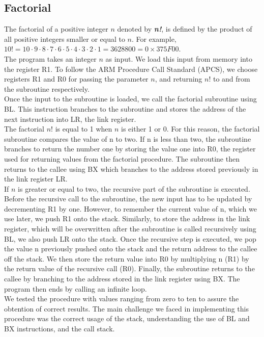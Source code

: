 \documentclass[10pt]{article}
\begin{document}
\subsection{Factorial}
The factorial of a positive integer $n$ denoted by \textbf{\textit{n!}}, is defined by the product of all positive integers smaller or equal to $n$. For example, $10! = 10 \cdot 9 \cdot 8 \cdot 7 \cdot 6 \cdot 5 \cdot 4 \cdot 3 \cdot 2 \cdot 1 = 3628800 = 0\times375F00$.\\
The program takes an integer $n$ as input. We load this input from memory into the register R1. To follow the ARM Procedure Call Standard (APCS), we choose registers R1 and R0 for passing the parameter $n$, and returning $n!$ to and from the subroutine respectively. \\
Once the input to the subroutine is loaded, we call the factorial subroutine using BL. This instruction branches to the subroutine and stores the address of the next instruction into LR, the link register.\\
The factorial $n!$ is equal to 1 when $n$ is either 1 or 0. For this reason, the factorial subroutine compares the value of n to two. If n is less than two, the subroutine branches to return the number one by storing the value one into R0, the register used for returning values from the factorial procedure. The subroutine then returns to the callee using BX which branches to the address stored previously in the link register LR.\\
If $n$ is greater or equal to two, the recursive part of the subroutine is executed. Before the recursive call to the subroutine, the new input has to be updated by decrementing R1 by one. However, to remember the current value of n, which we use later, we push R1 onto the stack. Similarly, to store the address in the link register, which will be overwritten after the subroutine is called recursively using BL, we also push LR onto the stack. Once the recursive step is executed, we pop the value n previously pushed onto the stack and the return address to the callee off the stack. We then store the return value into R0 by multiplying n (R1) by the return value of the recursive call (R0). Finally, the subroutine returns to the callee by branching to the address stored in the link register using BX.
The program then ends by calling an infinite loop. \\
We tested the procedure with values ranging from zero to ten to assure the obtention of correct results. The main challenge we faced in implementing this procedure was the correct usage of the stack, understanding the use of BL and BX instructions, and the call stack.
\end{document}
